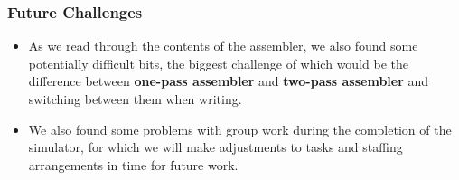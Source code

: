 \documentclass[11pt]{article}
\begin{document}
\subsubsection*{Future Challenges}

\begin{itemize}
  \item As we read through the contents of the assembler, we also found some potentially difficult bits, the biggest challenge of which would be the difference between \textbf{one-pass assembler} and \textbf{two-pass assembler} and switching between them when writing.
  \item We also found some problems with group work during the completion of the simulator, for which we will make adjustments to tasks and staffing arrangements in time for future work.
\end{itemize}
\end{document}
